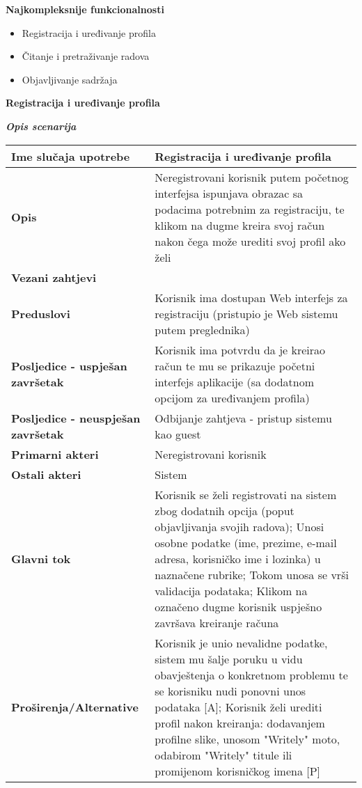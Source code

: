 \documentclass[12pt, a4paper]{report}
\begin{document}
\begin{flushleft}
{\large \textbf{Najkompleksnije funkcionalnosti}
\begin{itemize}
    \item Registracija i uređivanje profila
    \item Čitanje i pretraživanje radova
    \item Objavljivanje sadržaja \newline
\end{itemize} \newpage

\textbf{Registracija i uređivanje profila}}  \newline

\textbf{\textit{Opis scenarija}} \\
\begin{tabular}{|m{7cm}|m{7cm}|} 
 \hline
 \textbf{Ime slučaja upotrebe} & Registracija i uređivanje profila \\ 
 \hline
 \textbf{Opis} & Neregistrovani korisnik putem početnog interfejsa ispunjava obrazac sa podacima potrebnim za registraciju, te klikom na dugme kreira svoj račun nakon čega može urediti svoj profil ako želi \\ 
 \hline
 \textbf{Vezani zahtjevi} &  \\ 
 \hline
 \textbf{Preduslovi} & Korisnik ima dostupan Web interfejs za registraciju (pristupio je Web sistemu putem preglednika) \\ 
 \hline
 \textbf{Posljedice - uspješan završetak} & Korisnik ima potvrdu da je kreirao račun te mu se prikazuje početni interfejs aplikacije (sa dodatnom opcijom za uređivanjem profila) \\ 
 \hline
 \textbf{Posljedice - neuspješan završetak} & Odbijanje zahtjeva - pristup sistemu kao guest \\ 
 \hline
 \textbf{Primarni akteri} & Neregistrovani korisnik \\ 
 \hline
 \textbf{Ostali akteri} & Sistem \\ 
 \hline
 \textbf{Glavni tok} & Korisnik se želi registrovati na sistem zbog dodatnih opcija (poput objavljivanja svojih radova); Unosi osobne podatke (ime, prezime, e-mail adresa, korisničko ime i lozinka) u naznačene rubrike; Tokom unosa se vrši validacija podataka; Klikom na označeno dugme korisnik uspješno završava kreiranje računa \\ 
 \hline
 \textbf{Proširenja/Alternative} & Korisnik je unio nevalidne podatke, sistem mu šalje poruku u vidu obavještenja o konkretnom problemu te se korisniku nudi ponovni unos podataka [A]; Korisnik želi urediti profil nakon kreiranja: dodavanjem profilne slike, unosom "Writely" moto, odabirom "Writely" titule ili promijenom korisničkog imena [P] \\ 
 \hline
\end{tabular} \newpage


\end{flushleft}
\end{document}
